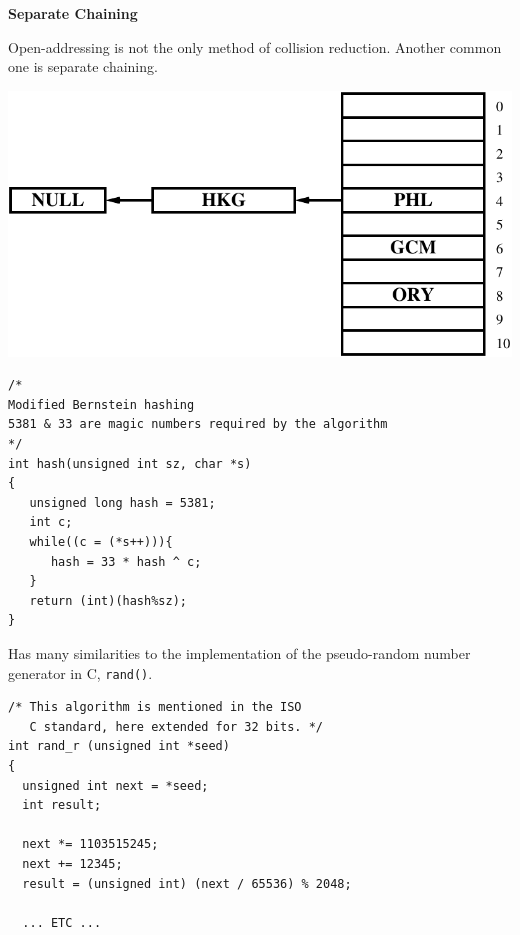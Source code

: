 \documentclass[a4,portraitt]{slides}
\begin{document}
{\newpage
{\samepage
\begin{center}
{\Large{\bf Separate Chaining}}
\end{center}
Open-addressing is not the only method of collision reduction. Another common
one is separate chaining.
\begin{center}
\includegraphics{../Images/hashsep.pdf}
\end{center}
}

\newpage
{\small
\begin{verbatim}
/*
Modified Bernstein hashing
5381 & 33 are magic numbers required by the algorithm
*/
int hash(unsigned int sz, char *s)
{
   unsigned long hash = 5381;
   int c;
   while((c = (*s++))){
      hash = 33 * hash ^ c;
   }
   return (int)(hash%sz);
}
\end{verbatim}

Has many similarities to the implementation of the pseudo-random number generator in C, \verb^rand()^.
{\small
\begin{verbatim}
/* This algorithm is mentioned in the ISO
   C standard, here extended for 32 bits. */
int rand_r (unsigned int *seed)
{
  unsigned int next = *seed;
  int result;

  next *= 1103515245;
  next += 12345;
  result = (unsigned int) (next / 65536) % 2048;

  ... ETC ...
\end{verbatim}
}
}

}
\end{document}
